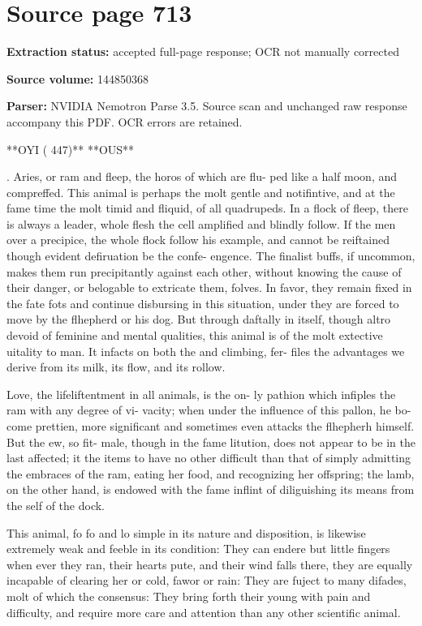 \clearpage
\section{Source page 713}
\textbf{Extraction status:} accepted full-page response; OCR not manually corrected\par
\textbf{Source volume:} 144850368\par
\textbf{Parser:} NVIDIA Nemotron Parse 3.5. Source scan and unchanged raw response accompany this PDF. OCR errors are retained.\par\medskip
**OYI ( 447)** **OUS**\par{}. Aries, or ram and fleep, the horos of which are flu- ped like a half moon, and compreffed. This animal is perhaps the molt gentle and notifintive, and at the fame time the molt timid and fliquid, of all quadrupeds. In a flock of fleep, there is always a leader, whole flesh the cell amplified and blindly follow. If the men over a precipice, the whole flock follow his example, and cannot be reiftained though evident defiruation be the confe- engence. The finalist buffs, if uncommon, makes them run precipitantly against each other, without knowing the cause of their danger, or belogable to extricate them, folves. In favor, they remain fixed in the fate fots and continue disbursing in this situation, under they are forced to move by the flhepherd or his dog. But through daftally in itself, though altro devoid of feminine and mental qualities, this animal is of the molt extective uitality to man. It infacts on both the and climbing, fer- files the advantages we derive from its milk, its flow, and its rollow.\par\medskip
Love, the lifeliftentment in all animals, is the on- ly pathion which infiples the ram with any degree of vi- vacity; when under the influence of this pallon, he bo- come prettien, more significant and sometimes even attacks the flhepherh himself. But the ew, so fit- male, though in the fame litution, does not appear to be in the last affected; it the items to have no other difficult than that of simply admitting the embraces of the ram, eating her food, and recognizing her offspring; the lamb, on the other hand, is endowed with the fame inflint of diliguishing its means from the self of the dock.\par\medskip
This animal, fo fo and lo simple in its nature and disposition, is likewise extremely weak and feeble in its condition: They can endere but little fingers when ever they ran, their hearts pute, and their wind falls there, they are equally incapable of clearing her or cold, fawor or rain: They are fuject to many difades, molt of which the consensus: They bring forth their young with pain and difficulty, and require more care and attention than any other scientific animal.\par\medskip

